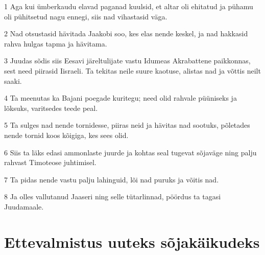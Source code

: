 \par 1 Aga kui ümberkaudu elavad paganad kuulsid, et altar oli ehitatud ja pühamu oli pühitsetud nagu ennegi, siis nad vihastasid väga.
\par 2 Nad otsustasid hävitada Jaakobi soo, kes elas nende keskel, ja nad hakkasid rahva hulgas tapma ja hävitama.
\par 3 Juudas sõdis siis Eesavi järeltulijate vastu Idumeas Akrabattene paikkonnas, sest need piirasid Iisraeli. Ta tekitas neile suure kaotuse, alistas nad ja võttis neilt saaki.
\par 4 Ta meenutas ka Bajani poegade kuritegu; need olid rahvale püüniseks ja lõksuks, varitsedes teede peal.
\par 5 Ta sulges nad nende tornidesse, piiras neid ja hävitas nad sootuks, põletades nende tornid koos kõigiga, kes sees olid.
\par 6 Siis ta läks edasi ammonlaste juurde ja kohtas seal tugevat sõjaväge ning palju rahvast Timoteose juhtimisel.
\par 7 Ta pidas nende vastu palju lahinguid, lõi nad puruks ja võitis nad.
\par 8 Ja olles vallutanud Jaaseri ning selle tütarlinnad, pöördus ta tagasi Juudamaale. 

\section*{Ettevalmistus uuteks sõjakäikudeks}

